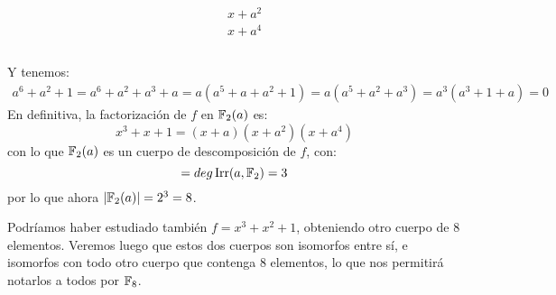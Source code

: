 \begin{ejemplo}
\begin{equation*}
\begin{array}{r|c}
\begin{array}{rcrcc}
            \end{array} & 
            \begin{array}{l}
                x+a^2 \\
                \hline
                x+a^4 \\ \\ \\ \\
            \end{array}
        \end{array}
    \end{equation*}
    Y tenemos:
    \begin{align*}
        a^6+a^2+1 = a^6+a^2 +a^3 +a = a(a^5+a+a^2+1) = a(a^5+a^2+a^3) = a^3(a^3 + 1 + a) = 0
    \end{align*}
    En definitiva, la factorización de $f$ en $\mathbb{F}_2(a)$ es:
    \begin{equation*}
        x^3+x+1 = (x+a)(x+a^2)(x+a^4)
    \end{equation*}
    con lo que $\mathbb{F}_2(a)$ es un cuerpo de descomposición de $f$, con:
    \begin{equation*}
        [\bb{F}_2(a):\bb{F}_2] = deg \Irr(a,\bb{F}_2) = 3
    \end{equation*}
    por lo que ahora $|\mathbb{F}_2(a)| = 2^3 = 8$.

    \noindent
    Podríamos haber estudiado también $f=x^3+x^2+1$, obteniendo otro cuerpo de $8$ elementos. Veremos luego que estos dos cuerpos son isomorfos entre sí, e isomorfos con todo otro cuerpo que contenga $8$ elementos, lo que nos permitirá notarlos a todos por $\mathbb{F}_8$.
\end{ejemplo}

